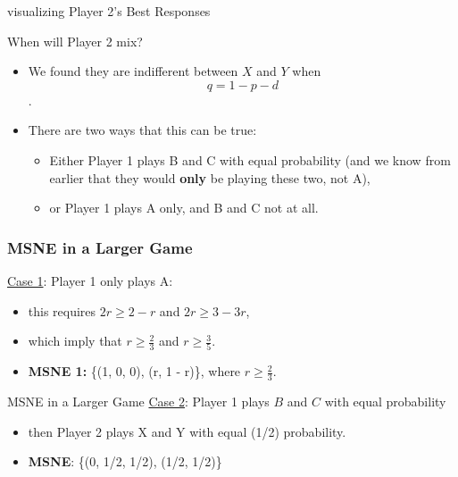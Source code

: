 \begin{frame}{visualizing Player 2's Best Responses}
  \begin{center}
  \end{center}
\end{frame}

\begin{frame}{When will Player 2 mix?}
  \begin{itemize}
    \item We found they are indifferent between $X$ and $Y$ when 
    $$ q = 1 - p - d $$.

	  \item There are two ways that this can be true: 
    \begin{itemize}
      \item Either Player 1 plays B and C with equal probability
      (and we know from earlier that they would \textbf{only} be playing these two, not A),
      \item or Player 1 plays A only, and B and C not at all. 
    \end{itemize}
  \end{itemize}
\end{frame}

\begin{frame}
\frametitle{MSNE in a Larger Game}
\underline{Case 1}: Player 1 only plays A:
\begin{itemize}
  \item this requires $2r \geq 2 - r$ and $2r \geq 3 - 3r$,
  \item which imply that $r \geq \frac{2}{3}$ and $r \geq \frac{3}{5}$.
  \item \textbf{MSNE 1:} \{(1, 0, 0), (r, 1 - r)\}, where $r \geq \frac{2}{3}$.
	\end{itemize}
\end{frame}

\begin{frame}{MSNE in a Larger Game}
\underline{Case 2}: Player 1 plays $B$ and $C$ with equal probability 
  \begin{itemize}
   \item then Player 2 plays X and Y with equal (1/2) probability.
    \item \textbf{MSNE}: \{(0, 1/2, 1/2), (1/2, 1/2)\}
  \end{itemize} 
\end{frame}

